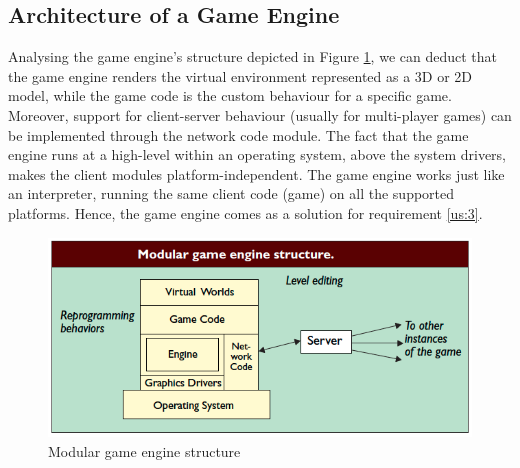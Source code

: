 \subsection{Architecture of a Game Engine}\label{subsec:game_engine_architecture}
Analysing the game engine's structure depicted in Figure \ref{fig:game_engine_structure}, we can deduct that the game engine renders the virtual environment represented as a 3D or 2D model, while the game code is the custom behaviour for a specific game. Moreover, support for client-server behaviour (usually for multi-player games) can be implemented through the network code module. The fact that the game engine runs at a high-level within an operating system, above the system drivers, makes the client modules platform-independent. The game engine works just like an interpreter, running the same client code (game) on all the supported platforms. Hence, the game engine comes as a solution for requirement \ref{us:3}.\\
\begin{figure}[H]
	\centering
	\includegraphics[width=\linewidth]{gfx/Chapter3/game_engine_structure}
	\caption{Modular game engine structure \cite{lewis2002game}}
	\label{fig:game_engine_structure}
\end{figure}

